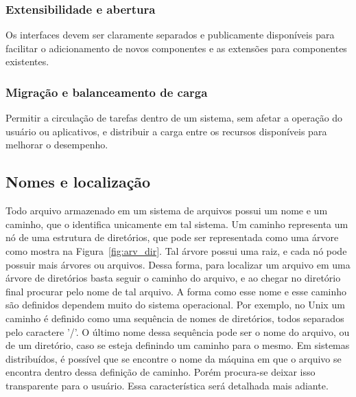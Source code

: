 	
	\subsubsection{Extensibilidade e abertura}
	Os interfaces devem ser claramente separados e publicamente disponíveis para facilitar o adicionamento de novos componentes e as extensões para componentes existentes.
	
	\subsubsection{Migração e balanceamento de carga}
	Permitir a circulação de tarefas dentro de um sistema, sem afetar a operação do usuário ou aplicativos, e distribuir a carga entre os recursos disponíveis para melhorar o desempenho.
	
	
	
		
	\subsection{Nomes e localização}
	Todo arquivo armazenado em um sistema de arquivos possui um nome e um caminho, que o identifica unicamente em tal sistema.
	Um caminho representa um nó de uma estrutura de diretórios, que pode ser representada como uma árvore como mostra na Figura~\ref{fig:arv_dir}.
	Tal árvore possui uma raiz, e cada nó pode possuir mais árvores ou arquivos.
	Dessa forma, para localizar um arquivo em uma árvore de diretórios basta seguir o caminho do arquivo, e ao chegar no diretório final procurar pelo nome de tal arquivo.
	A forma como esse nome e esse caminho são definidos dependem muito do sistema operacional. Por exemplo, no Unix um caminho é definido como uma sequência de nomes de diretórios, todos separados pelo caractere ’/’. O último nome dessa sequência pode ser o nome do arquivo, ou de um diretório, caso se esteja definindo um caminho para o mesmo.
	Em sistemas distribuídos, é possível que se encontre o nome da máquina em que o arquivo se encontra dentro dessa definição de caminho. Porém procura-se deixar isso transparente para o usuário. Essa característica será detalhada mais adiante.
	

